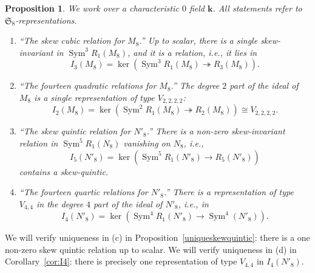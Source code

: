 \documentclass{amsart}
\newtheorem{proposition}[theorem]{Proposition}
\theoremstyle{definition}
\theoremstyle{remark}
\DeclareMathOperator{\Sym}{Sym}
\def\SS{\mathfrak{S}}
\def\fieldk{\mathbf{k}}
\begin{document}
\begin{proposition}
\label{p:repfacts}
We work over a characteristic $0$ field $\fieldk$.  All statements refer to $\SS_8$-representations.
\begin{enumerate}
\item[(a)] {\em ``The skew cubic relation for $M_8$.''}
Up to scalar, there is a single skew-invariant in $\Sym^3 R_1(M_8)$, and it is a relation, i.e., it lies in
\begin{displaymath}
I_3(M_8) = \ker \left( \Sym^3 R_1(M_8) \twoheadrightarrow R_3(M_8) \right).
\end{displaymath}
\item[(b)] {\em ``The fourteen quadratic relations for $M_8$.''}
The degree $2$ part of the ideal of $M_8$ is a single representation of type $V_{2,2,2,2}$:
\begin{displaymath}
I_2(M_8) = \ker \left( \Sym^2 R_1(M_8) \twoheadrightarrow R_2(M_8) \right) \cong V_{2,2,2,2}.
\end{displaymath}
\item [(c)] {\em ``The skew quintic relation for $N'_8$.''}
There is a non-zero skew-invariant  relation in $\Sym^5 R_1(N_8)$ vanishing on $N_8$, i.e.,
\begin{displaymath}
I_5(N'_8) = \ker \left( \Sym^5 R_1(N'_8) \rightarrow R_5(N'_8) \right)
\end{displaymath}
contains a skew-quintic.
\item[(d)] {\em ``The fourteen quartic relations for $N'_8$.''}
There is a representation of type $V_{4,4}$ in the degree $4$ part of the ideal of $N'_8$, i.e., in 
\begin{displaymath}
I_4(N'_8) = \ker \left( \Sym^4 R_1(N'_8) \rightarrow \Sym^4 (N'_8) \right).
\end{displaymath}
\end{enumerate}
\end{proposition}

We will verify uniqueness in (c) in
Proposition~\ref{uniqueskewquintic}:  there is a one non-zero skew quintic
relation up to scalar.
We will verify uniqueness in (d) in Corollary~\ref{cor:I4}:  there
is precisely one representation of type $V_{4,4}$ in $I_4(N'_8)$.  
\end{document}

